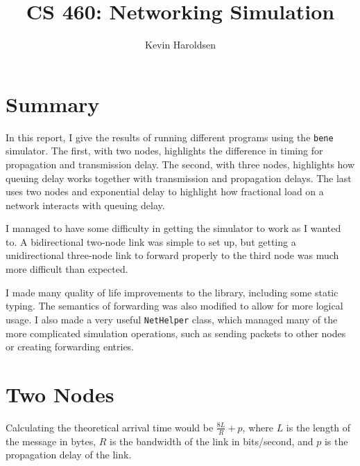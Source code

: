\documentclass[fleqn,11pt]{article}
\title{CS 460: Networking Simulation}
\author{Kevin Haroldsen}
\date{}
\begin{document}
\maketitle

\section{Summary}
In this report, I give the results of running different programs using the \texttt{bene} simulator.
The first, with two nodes, highlights the difference in timing for propagation and transmission delay.
The second, with three nodes, highlights how queuing delay works together with transmission and propagation delays.
The last uses two nodes and exponential delay to highlight how fractional load on a network interacts with queuing delay.

I managed to have some difficulty in getting the simulator to work as I wanted to.
A bidirectional two-node link was simple to set up,
but getting a unidirectional three-node link to forward properly to the third node was much more difficult than expected.

I made many quality of life improvements to the library, including some static typing.
The semantics of forwarding was also modified to allow for more logical usage.
I also made a very useful \texttt{NetHelper} class, which managed many of the more complicated simulation operations, such as sending packets to other nodes or creating forwarding entries.

\section{Two Nodes}
Calculating the theoretical arrival time would be
$ \frac{8L}{R} + p $,
where $ L $ is the length of the message in bytes,
$ R $ is the bandwidth of the link in bits/second,
and $ p $ is the propagation delay of the link.

\newcommand{\twonodes}[2]{%
\begin{tikzpicture}[on grid,auto,node distance=3cm,baseline]%
\node[state] (n1) {$ n_1 $};%
\node[state] (n2) [right of=n1] {$ n_2 $};%
\path[<->] (n1) edge node [above] {#1} node [below] {#2} (n2);%
\end{tikzpicture}%
\vspace{.5em}
}
\end{document}
